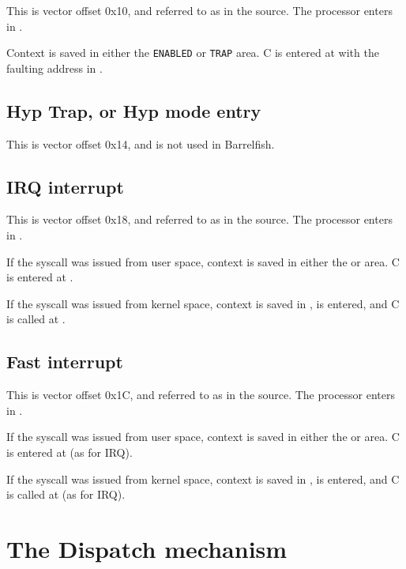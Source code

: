 \documentclass[a4paper,twoside]{report} %
\begin{document}
This is vector offset 0x10, and referred to as
 in the source. 
The processor enters  in .

Context is saved in either the \texttt{ENABLED} or \texttt{TRAP} area.
C is entered at  with the faulting
address in . 

\section{Hyp Trap, or Hyp mode entry}

This is vector offset 0x14, and is not used in Barrelfish.

\section{IRQ interrupt}

This is vector offset 0x18, and referred to as
 in the source. 
The processor enters  in . 

If the syscall was issued from user space, context is saved in either
the  or  area.  C is entered at
.  

If the syscall was issued from kernel space, context is saved in
,  is entered, and C is called at
. 

\section{Fast interrupt}

This is vector offset 0x1C, and referred to as
 in the source. 
The processor enters  in . 

If the syscall was issued from user space, context is saved in either
the  or  area.  C is entered at
 (as for IRQ).

If the syscall was issued from kernel space, context is saved in
,  is entered, and C is called at
 (as for IRQ).

\chapter{The Dispatch mechanism}
\end{document}
